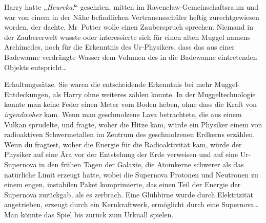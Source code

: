 Harry hatte „\emph{Heureka!}“ geschrien, mitten im Ravenclaw-Gemeinschaftsraum und war von einem in der Nähe befindlichen Vertrauensschüler heftig zurechtgewiesen worden, der dachte, Mr~Potter wolle einen Zauberspruch sprechen. Niemand in der Zaubererwelt wusste oder interessierte sich für einen alten Muggel namens Archimedes, noch für die Erkenntnis des Ur-Physikers, dass das aus einer Badewanne verdrängte Wasser dem Volumen des in die Badewanne eintretenden Objekts entspricht…

Erhaltungssätze. Sie waren die entscheidende Erkenntnis bei mehr Muggel-Entdeckungen, als Harry ohne weiteres zählen konnte. In der Muggeltechnologie konnte man keine Feder einen Meter vom Boden heben, ohne dass die Kraft von \emph{irgendwoher} kam. Wenn man geschmolzene Lava betrachtete, die aus einem Vulkan sprudelte, und fragte, woher die Hitze kam, würde ein Physiker einem von radioaktiven Schwermetallen im Zentrum des geschmolzenen Erdkerns erzählen. Wenn du fragtest, woher die Energie für die Radioaktivität kam, würde der Physiker auf eine Ära vor der Entstehung der Erde verweisen und auf eine Ur-Supernova in den frühen Tagen der Galaxie, die Atomkerne schwerer als das natürliche Limit erzeugt hatte, wobei die Supernova Protonen und Neutronen zu einem engen, instabilen Paket komprimierte, das einen Teil der Energie der Supernova zurückgab, als es zerbrach. Eine Glühbirne wurde durch Elektrizität angetrieben, erzeugt durch ein Kernkraftwerk, ermöglicht durch eine Supernova… Man könnte das Spiel bis zurück zum Urknall spielen.

